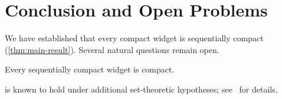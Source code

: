 
\chapter{Conclusion and Open Problems}\label{cha:conclusion}

We have established that every compact widget is sequentially compact
(\cref{thm:main-result}).
Several natural questions remain open.

\begin{conjecture}\label{conj:converse}
  Every sequentially compact widget is compact.
\end{conjecture}

\begin{remark}\label{rem:counterexample}
   is known to hold under additional set-theoretic
  hypotheses;
  see~\cite{Kelley:1955} for details.
\end{remark}

